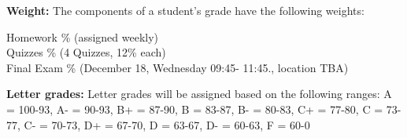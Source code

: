 \documentclass[12pt]{article}\usepackage[]{graphicx}\usepackage[]{color}
\begin{document}
\begin{center} 
\begin{minipage}{6.5in}
\begin{flushleft}
\textbf{Weight:} The components of a student's grade have the following weights:\\
\begin{center} 
\begin{minipage}{6in}
\begin{flushleft}
Homework \%  (assigned weekly) \\
Quizzes \%  (4 Quizzes, 12\% each) \\
Final Exam \% (December 18, Wednesday 09:45- 11:45., location TBA) \\
\end{flushleft}
\end{minipage}
\end{center}
\end{flushleft}
\end{minipage}
\end{center}

\begin{center} 
\begin{minipage}{6.5in}
\begin{flushleft}
\textbf{Letter grades:} 
Letter grades will be assigned based on the following ranges: A = 100-93, A- = 90-93, B+ = 87-90, B = 83-87, B- = 80-83, C+ = 77-80, C = 73-77, C- = 70-73, D+ = 67-70, D = 63-67, D- = 60-63, F = 60-0
\end{flushleft}
\end{minipage}
\end{center}
\end{document}

